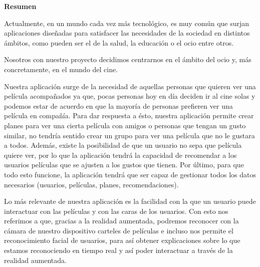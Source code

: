
\newpage

\thispagestyle{empty}

\begin{center}

{\bf \Huge Resumen}

  \end{center}
\vspace{1cm}

Actualmente, en un mundo cada vez más tecnológico, es muy común que surjan aplicaciones diseñadas
para satisfacer las necesidades de la sociedad en distintos ámbitos, como pueden ser el de la salud, la educación o el ocio entre otros.

Nosotros con nuestro proyecto decidimos centrarnos en el ámbito del ocio y, más concretamente, en el mundo del cine.

Nuestra aplicación surge de la necesidad de aquellas personas que quieren ver una película acompañados ya que, pocas personas hoy en día deciden ir al cine solas y 
podemos estar de acuerdo en que la mayoría de personas prefieren ver una película en compañía.
Para dar respuesta a ésto, nuestra aplicación permite crear planes para ver una cierta película con amigos o personas que tengan un gusto similar, no tendría sentido crear un grupo para ver una película que no le gustara a todos.
Además, existe la posibilidad de que un usuario no sepa que película quiere ver, por lo que la aplicación tendrá la capacidad
de recomendar a los usuarios películas que se ajusten a los gustos que tienen. Por último, para que todo esto funcione, la aplicación tendrá que ser capaz de 
gestionar todos los datos necesarios (usuarios, películas, planes, recomendaciones).

Lo más relevante de nuestra aplicación es la facilidad con la que un usuario puede interactuar con las películas y con las caras de los usuarios. Con esto nos referimos a que, gracias a la realidad aumentada,
podremos reconocer con la cámara de nuestro dispositivo carteles de películas e incluso nos permite el reconocimiento facial de usuarios, para así
obtener explicaciones sobre lo que estamos reconociendo en tiempo real y así poder interactuar a 
través de la realidad aumentada.
\vspace{1cm}


